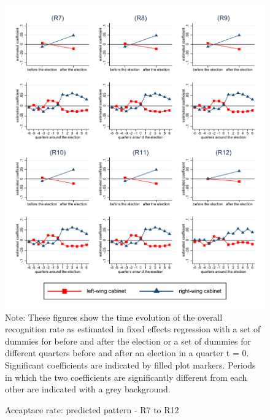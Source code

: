 \documentclass[11pt,a4paper]{scrartcl}
\begin{document}
\clearpage
\FloatBarrier



\clearpage
\FloatBarrier






\clearpage
\FloatBarrier


\clearpage
\FloatBarrier
\begin{figure}[!ht]
	\caption{Accaptace rate: predicted pattern - R7 to R12}
	\includegraphics[width=1\textwidth]{../results/decisions/acceptance_rate_graphs_R7-R12.pdf}
	\scriptsize{Note: These figures show the time evolution of the overall recognition rate as estimated in fixed effects regression with a set of dummies for before and after the election or a set of dummies for different quarters before and after an election in a quarter t = 0. Significant coefficients are indicated by filled plot markers. Periods in which the two coefficients are significantly different from each other are indicated with a grey background.}
\end{figure}
\end{document}
